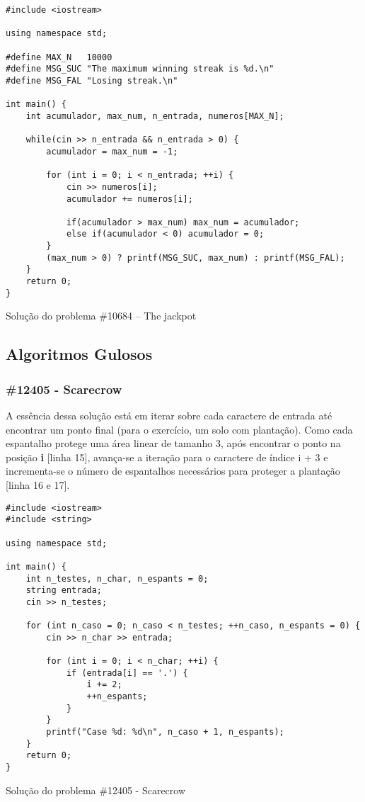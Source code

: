 \documentclass[a4paper,12pt]{scrartcl}
\begin{document}
\begin{listing}[H]
\begin{verbatim}
#include <iostream>

using namespace std;

#define MAX_N   10000
#define MSG_SUC "The maximum winning streak is %d.\n"
#define MSG_FAL "Losing streak.\n"

int main() {
    int acumulador, max_num, n_entrada, numeros[MAX_N];

    while(cin >> n_entrada && n_entrada > 0) {
        acumulador = max_num = -1;

        for (int i = 0; i < n_entrada; ++i) {
            cin >> numeros[i];
            acumulador += numeros[i];

            if(acumulador > max_num) max_num = acumulador;
            else if(acumulador < 0) acumulador = 0;
        }
        (max_num > 0) ? printf(MSG_SUC, max_num) : printf(MSG_FAL);
    }
    return 0;
}
\end{verbatim}
\caption{\footnotesize{Solução do problema \#10684 – The jackpot}}
\end{listing}


\subsection{Algoritmos Gulosos}
\subsubsection{\#12405 - Scarecrow}
A essência dessa solução está em iterar sobre cada caractere de entrada até encontrar um ponto final (para o exercício, um solo com plantação). Como cada espantalho protege uma área linear de tamanho 3, após encontrar o ponto na posição \textbf{i} [linha 15], avança-se a iteração para o caractere de índice i + 3 e incrementa-se o número de espantalhos necessários para proteger a plantação [linha 16 e 17].

\begin{listing}[H]
\begin{verbatim}
#include <iostream>
#include <string>

using namespace std;

int main() {
    int n_testes, n_char, n_espants = 0;
    string entrada;
    cin >> n_testes;

    for (int n_caso = 0; n_caso < n_testes; ++n_caso, n_espants = 0) {
        cin >> n_char >> entrada;

        for (int i = 0; i < n_char; ++i) {
            if (entrada[i] == '.') {
                i += 2;
                ++n_espants;
            }
        }
        printf("Case %d: %d\n", n_caso + 1, n_espants);
    }
    return 0;
}
\end{verbatim}
\caption{\footnotesize{Solução do problema \#12405 - Scarecrow}}
\end{listing}
\end{document}
